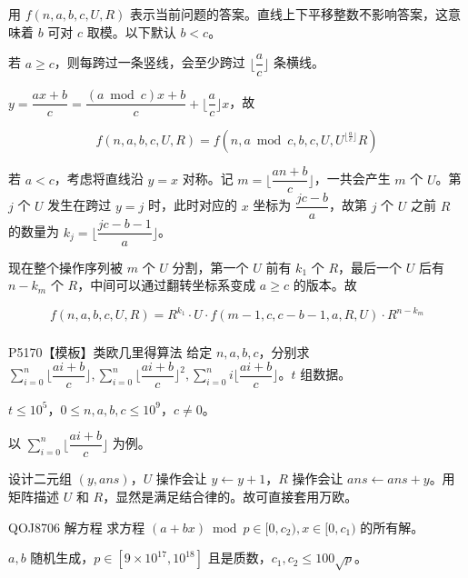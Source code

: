 \documentclass[../main.tex]{subfiles}
\begin{document}
\begin{frame}
用 $f(n,a,b,c,U,R)$ 表示当前问题的答案。直线上下平移整数不影响答案，这意味着 $b$ 可对 $c$ 取模。以下默认 $b<c$。\pause

若 $a\ge c$，则每跨过一条竖线，会至少跨过 $\lfloor\dfrac{a}{c}\rfloor$ 条横线。\pause

$y=\dfrac{ax+b}{c}=\dfrac{(a\bmod c)x+b}{c}+\lfloor\dfrac{a}{c}\rfloor x$，故

$$
f(n,a,b,c,U,R)=f(n,a\bmod c,b,c,U,U^{\lfloor\frac{a}{c}\rfloor}R)
$$
\end{frame}

\begin{frame}
若 $a<c$，考虑将直线沿 $y=x$ 对称。记 $m=\lfloor\dfrac{an+b}{c}\rfloor$，一共会产生 $m$ 个 $U$。第 $j$ 个 $U$ 发生在跨过 $y=j$ 时，此时对应的 $x$ 坐标为 $\dfrac{jc-b}{a}$，故第 $j$ 个 $U$ 之前 $R$ 的数量为 $k_j=\lfloor\dfrac{jc-b-1}{a} \rfloor$。\pause

现在整个操作序列被 $m$ 个 $U$ 分割，第一个 $U$ 前有 $k_1$ 个 $R$，最后一个 $U$ 后有 $n-k_m$ 个 $R$，中间可以通过翻转坐标系变成 $a\ge c$ 的版本。故

$$
f(n,a,b,c,U,R)=R^{k_1}\cdot U\cdot f(m-1,c,c-b-1,a,R,U)\cdot R^{n-k_m}
$$
\end{frame}

\subsubsection{}

\begin{frame}{P5170【模板】类欧几里得算法}
给定 $n,a,b,c$，分别求 $\sum\limits_{i=0}^n\lfloor\dfrac{ai+b}{c}\rfloor,\sum\limits_{i=0}^n\lfloor\dfrac{ai+b}{c}\rfloor^2,\sum\limits_{i=0}^n i\lfloor\dfrac{ai+b}{c}\rfloor$。$t$ 组数据。

$t\le 10^5$，$0\le n,a,b,c\le 10^9$，$c\neq 0$。
\end{frame}

\begin{frame}
以 $\sum\limits_{i=0}^n\lfloor\dfrac{ai+b}{c}\rfloor$ 为例。

设计二元组 $(y,ans)$，$U$ 操作会让 $y\leftarrow y+1$，$R$ 操作会让 $ans\leftarrow ans+y$。用矩阵描述 $U$ 和 $R$，显然是满足结合律的。故可直接套用万欧。
\end{frame}

\begin{frame}{QOJ8706 解方程}
求方程 $(a+bx)\bmod p\in[0,c_2),x\in[0,c_1)$ 的所有解。

$a,b$ 随机生成，$p\in[9\times10^{17},10^{18}]$ 且是质数，$c_1,c_2\le 100\sqrt{p}$。
\end{frame}
\end{document}
